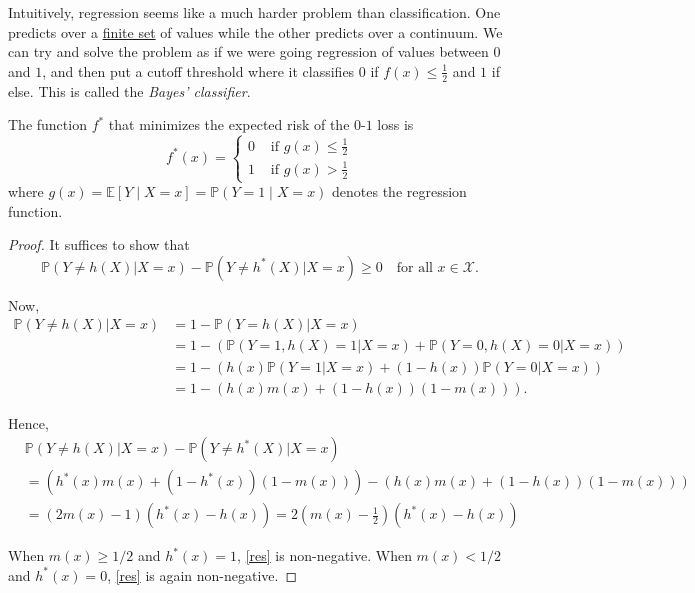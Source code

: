 Intuitively, regression seems like a much harder problem than classification. One predicts over a \hyperref[st-def:finite-set]{finite set} of values while the other predicts over a continuum. We can try and solve the problem as if we were going regression of values between $0$ and $1$, and then put a cutoff threshold where it classifies $0$ if $f(x) \leq \frac{1}{2}$ and $1$ if else. This is called the \textit{Bayes' classifier}. 

\begin{theorem}
  \label{thm:bayes_optimality}
  The function $f^\ast$ that minimizes the expected risk of the $0$-$1$ loss is 
  \begin{equation}
    f^\ast(x) = \begin{cases} 
      0 & \text{ if } g(x) \leq \frac{1}{2} \\ 
      1 & \text{ if } g(x) > \frac{1}{2} 
    \end{cases}
  \end{equation}
  where $g(x) = \mathbb{E}[Y \mid X = x] = \mathbb{P}(Y = 1 \mid X = x)$ denotes the regression function. 
\end{theorem}
\begin{proof}
  It suffices to show that
  \begin{equation}
    \mathbb{P}(Y \neq h(X)|X = x) - \mathbb{P}(Y \neq h^*(X)|X = x) \geq 0 \quad \text{for all } x \in \mathcal{X}.
  \end{equation}
  
  Now,
  \begin{align}
    \mathbb{P}(Y \neq h(X)|X = x) &= 1 - \mathbb{P}(Y = h(X)|X = x) \\
    &= 1 - \left(\mathbb{P}(Y = 1, h(X) = 1|X = x) + \mathbb{P}(Y = 0, h(X) = 0|X = x)\right) \\
    &= 1 - \left(h(x)\mathbb{P}(Y = 1|X = x) + (1 - h(x))\mathbb{P}(Y = 0|X = x)\right) \\
    &= 1 - \left(h(x)m(x) + (1 - h(x))(1 - m(x))\right).
  \end{align}
  
  Hence,
  \begin{align}
    &\mathbb{P}(Y \neq h(X)|X = x) - \mathbb{P}(Y \neq h^*(X)|X = x) \\
    &= \left(h^*(x)m(x) + (1 - h^*(x))(1 - m(x))\right) - \left(h(x)m(x) + (1 - h(x))(1 - m(x))\right) \\
    &= (2m(x) - 1)(h^*(x) - h(x)) = 2\left(m(x) - \frac{1}{2}\right)(h^*(x) - h(x)) \label{res}
  \end{align}
  
  When $m(x) \geq 1/2$ and $h^*(x) = 1$, \eqref{res} is non-negative. When $m(x) < 1/2$ and $h^*(x) = 0$, \eqref{res} is again non-negative. 
\end{proof}


